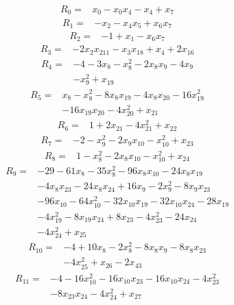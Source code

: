 \begin{align*} R_{0}={}&x_{0} -x_{0}x_{4} -x_{4} +x_{7}
\end{align*}
\begin{align*} R_{1}={}&-x_{2} -x_{4}x_{5} +x_{6}x_{7}
\end{align*}
\begin{align*} R_{2}={}&-1 +x_{1} -x_{6}x_{7}
\end{align*}
\begin{align*} R_{3}={}&-2 x_{2}x_{211} -x_{3}x_{18} +x_{4} +2 x_{16}
\end{align*}
\begin{align*} R_{4}={}&-4 -3 x_{8} -x_{8}^{2} -2 x_{8}x_{9} -4 x_{9}
\\ &-x_{9}^{2} +x_{19}
\end{align*}
\begin{align*} R_{5}={}&x_{8} -x_{8}^{2} -8 x_{8}x_{19} -4 x_{8}x_{20} -16 x_{19}^{2}
\\ &-16 x_{19}x_{20} -4 x_{20}^{2} +x_{21}
\end{align*}
\begin{align*} R_{6}={}&1 +2 x_{21} -4 x_{21}^{2} +x_{22}
\end{align*}
\begin{align*} R_{7}={}&-2 -x_{9}^{2} -2 x_{9}x_{10} -x_{10}^{2} +x_{23}
\end{align*}
\begin{align*} R_{8}={}&1 -x_{8}^{2} -2 x_{8}x_{10} -x_{10}^{2} +x_{24}
\end{align*}
\begin{align*} R_{9}={}&-29 -61 x_{8} -35 x_{8}^{2} -96 x_{8}x_{10} -24 x_{8}x_{19}
\\ &-4 x_{8}x_{23} -24 x_{8}x_{24} +16 x_{9} -2 x_{9}^{2} -8 x_{9}x_{23}
\\ &-96 x_{10} -64 x_{10}^{2} -32 x_{10}x_{19} -32 x_{10}x_{24} -28 x_{19}
\\ &-4 x_{19}^{2} -8 x_{19}x_{24} +8 x_{23} -4 x_{23}^{2} -24 x_{24}
\\ &-4 x_{24}^{2} +x_{25}
\end{align*}
\begin{align*} R_{10}={}&-4 +10 x_{8} -2 x_{8}^{2} -8 x_{8}x_{9} -8 x_{8}x_{23}
\\ &-4 x_{25}^{2} +x_{26} -2 x_{43}
\end{align*}
\begin{align*} R_{11}={}&-4 -16 x_{10}^{2} -16 x_{10}x_{23} -16 x_{10}x_{24} -4 x_{23}^{2}
\\ &-8 x_{23}x_{24} -4 x_{24}^{2} +x_{27}
\end{align*}
